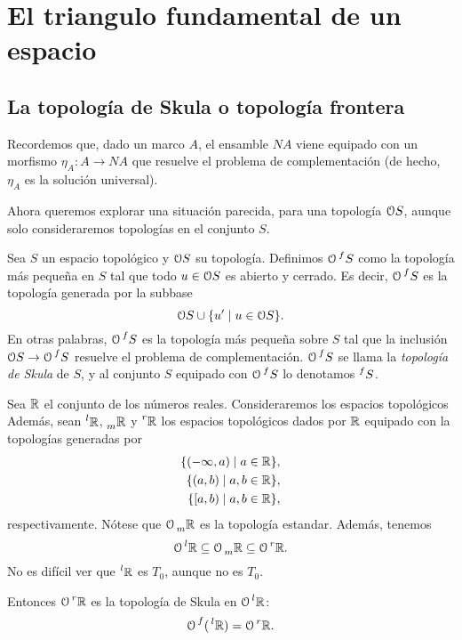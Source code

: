 \chapter{El triangulo fundamental de un espacio}
\section{La topología de Skula o topología frontera}

Recordemos que, dado un marco $A$, el ensamble $NA$ viene equipado con
un morfismo $\eta_A:A\to NA$ que resuelve el problema de complementación
(de hecho, $\eta_A$ es la solución universal).

Ahora queremos explorar una situación parecida, para una topología
$\cal OS$, aunque solo consideraremos topologías en el conjunto $S$.

\begin{definition}
    Sea $S$ un espacio topológico y $\cal OS$ su topología.
    Definimos $\cal O\prs f{}S$ como la topología más pequeña
    en $S$ tal que todo $u\in\cal OS$ es abierto y cerrado.
    Es decir, $\cal O\prs f{}S$ es la topología generada por la subbase
    \[
        \cal OS\cup\{u'\mid u\in\cal OS\}
    .\]
    En otras palabras, $\cal O\prs f{}S$
    es la topología más pequeña sobre $S$
    tal que la inclusión $\cal OS\to\cal O\prs f{}S$ resuelve
    el problema de complementación.
    $\cal O\prs f{}S$ se llama la \emph{topología de Skula}
    de $S$, y al conjunto $S$ equipado con $\cal O\prs f{}S$
    lo denotamos $\prs f{}S$.
\end{definition}

\begin{example}
    Sea $\R$ el conjunto de los números reales.
    Consideraremos los espacios topológicos
    Además, sean $\prs l{}\R$, $\prs{}m\R$
    y $\prs r{}\R$ los espacios topológicos dados por $\R$
    equipado con la topologías generadas por
    \begin{align*}
        \{(-\infty,a)\mid a\in\R\}, \\
        \{(a,b)\mid a,b\in\R\}, \\
        \{[a,b)\mid a,b\in\R\},
    \end{align*}
    respectivamente.
    Nótese que $\cal O\prs{}m\R$ es la topología estandar.
    Además, tenemos
    \[
        \cal O\prs l{}\R
        \subseteq
        \cal O\prs{}m\R
        \subseteq
        \cal O\prs r{}\R.
    \]
    No es difícil ver que $\prs l{}\R$ es $T_0$,
    aunque no es $T_0$.
    
    Entonces $\cal O\prs r{}\R$ es la topología de Skula
    en $\cal O\prs l{}\R$:
    \[
        \cal O\prs f{}(\prs l{}\R)
        = \cal O\prs r{}\R
    .\]
\end{example}

